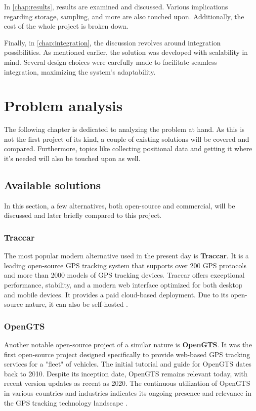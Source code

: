 \documentclass[FM,BP,EN,fonts]{tulthesis}
\begin{document}
In \autoref{chap:results}, results are examined and discussed. Various implications regarding storage, sampling, and more are also touched upon. Additionally, the cost of the whole project is broken down.

Finally, in \autoref{chap:integration}, the discussion revolves around integration possibilities. As mentioned earlier, the solution was developed with scalability in mind. Several design choices were carefully made to facilitate seamless integration, maximizing the system's adaptability.

\chapter{Problem analysis}
\label{chap:problem-analysis}
The following chapter is dedicated to analyzing the problem at hand. As this is not the first project of its kind, a couple of existing solutions will be covered and compared. Furthermore, topics like collecting positional data and getting it where it's needed will also be touched upon as well.

\section{Available solutions}
In this section, a few alternatives, both open-source and commercial, will be discussed and later briefly compared to this project.

\subsection{Traccar}
The most popular modern alternative used in the present day is \textbf{Traccar}. It is a leading open-source GPS tracking system that supports over 200 GPS protocols and more than 2000 models of GPS tracking devices. Traccar offers exceptional performance, stability, and a modern web interface optimized for both desktop and mobile devices. It provides a paid cloud-based deployment. Due to its open-source nature, it can also be self-hosted \cite{traccar}.

\subsection{OpenGTS}
Another notable open-source project of a similar nature is \textbf{OpenGTS}. It was the first open-source project designed specifically to provide web-based GPS tracking services for a "fleet" of vehicles. The initial tutorial and guide for OpenGTS dates back to 2010. Despite its inception date, OpenGTS remains relevant today, with recent version updates as recent as 2020. The continuous utilization of OpenGTS in various countries and industries indicates its ongoing presence and relevance in the GPS tracking technology landscape \cite{opengts}.
\end{document}
